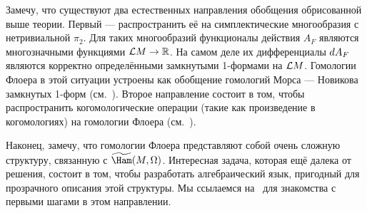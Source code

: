 Замечу, что существуют два естественных направления обобщения
обрисованной выше теории. 
Первый — распространить её на симплектические многообразия с
нетривиальной $π_{2}$. 
Для таких многообразий функционалы действия $A_{F}$ являются
многозначными функциями $\mathcal{L} M\to\mathbb{R}$. На самом деле их дифференциалы
$d A_{F}$ являются корректно определёнными замкнутыми 1-формами на
$\mathcal{L} M$.
Гомологии Флоера в этой ситуации устроены как обобщение гомологий
Морса — Новикова замкнутых 1-форм (см.~\cite{HS}).
Второе направление состоит в том, чтобы распространить
когомологические операции (такие как произведение в когомологиях) на
гомологии Флоера (см.~\cite{PSS}). 

Наконец, замечу, что гомологии Флоера
представляют собой очень сложную структуру, связанную с
$\widetilde\Ham(M,\Omega)$. 
Интересная задача, которая ещё далека от решения, состоит в том, чтобы
разработать алгебраический язык, пригодный для прозрачного описания
этой структуры. 
Мы ссылаемся на~\cite{Fu} для знакомства с первыми шагами в
этом направлении.  




